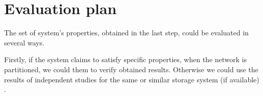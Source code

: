 \documentclass[a4paper]{article}
\begin{document}
\section*{Evaluation plan}

The set of system's properties, obtained in the last step, could be evaluated in several ways.

Firstly, if the system claims to satisfy specific properties, when the network is partitioned, we could them to verify obtained results.
Otherwise we could use the results of independent studies for the same or similar storage system (if available) \cite{jepsen}.

\printbibliography
\end{document}
